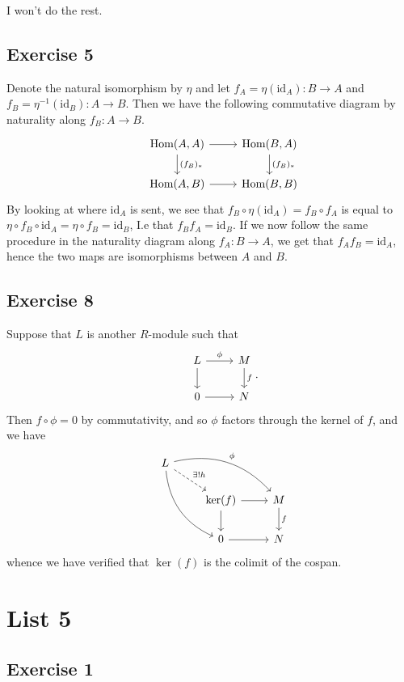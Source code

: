 \documentclass{article}
\theoremstyle{definition}
\newcommand{\Hom}{\text{Hom}}
\newcommand{\id}{\text{id}}
\begin{document}
I won't do the rest.

\subsection*{Exercise 5}

Denote the natural isomorphism by $\eta$ and let $f_A = \eta(\id_A) : B \to A$
and $f_B = \eta^{-1}(\id_B) : A \to B$. Then we have the following commutative
diagram by naturality along $f_B : A \to B$.
\[
\begin{tikzcd}
	& \Hom(A, A)
	\arrow{r}
	\arrow{d}{(f_B)_{*}}
	& \Hom(B, A) 
	\arrow{d}{(f_B)_{*}} \\
	& \Hom(A, B)
	\arrow{r}
	& \Hom(B, B) 
\end{tikzcd}
\] 
By looking at where $\id_A$ is sent, we see that $f_B \circ \eta(\id_A) = f_B
\circ f_A$ is equal to $\eta \circ f_B \circ \id_A = \eta \circ f_B = \id_B$,
I.e that $f_B f_A = \id_B$. If we now follow the same procedure in the
naturality diagram along $f_A : B \to A$, we get that $f_A f_B = \id_A$, hence
the two maps are isomorphisms between $A$ and $B$.

\subsection*{Exercise 8}

Suppose that $L$ is another $R$-module such that 
\[
\begin{tikzcd}
	& L
	\ar{r}{\phi}
	\ar{d} 
	& M
	\ar{d}{f}
	\\
	& 0
	\ar{r}
	& N
\end{tikzcd}.
\] 
Then $f \circ \phi = 0$ by commutativity, and so $\phi$ factors through the kernel of $f$,
and we have
\[
\begin{tikzcd}
	& L
	\ar[dashed]{rd}{\exists ! h} 
	\ar[bend left=30]{drr}{\phi}
	\ar[bend right=30]{ddr}
	\\
	& & \ker(f)
	\ar{r}
	\ar{d} 
	& M
	\ar{d}{f}
	\\
	& & 0
	\ar{r}
	& N
\end{tikzcd}
\] 
whence we have verified that $\ker(f)$ is the colimit of the cospan.

\section*{List 5}

\subsection*{Exercise 1}
\end{document}
